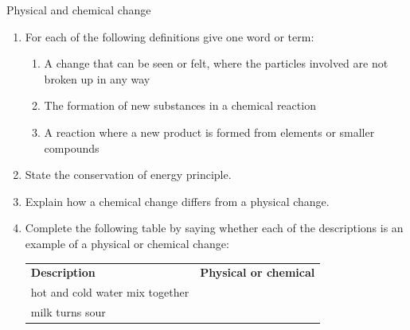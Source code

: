 \label{m38711*secfhsst!!!underscore!!!id584}
            \begin{eocexercises}{Physical and chemical change}
            \nopagebreak
      \label{m38711*id65631}\begin{enumerate}[noitemsep, label=\textbf{\arabic*}. ] 
            \label{m38711*uid6234}\item For each of the following definitions give one word or term:
\label{m38711*id632243}\begin{enumerate}[noitemsep, label=\textbf{\alph*}. ] 
            \item A change that can be seen or felt, where the particles involved are not broken up in any way\item The formation of new substances in a chemical reaction\item A reaction where a new product is formed from elements or smaller compounds\end{enumerate}
\label{m38711*id63272}\item State the conservation of energy principle.\newline
\label{m38711*id6244}\item Explain how a chemical change differs from a physical change.\newline
\label{m38711*uid52}\item Complete the following table by saying whether each of the descriptions is an example of a physical or chemical change:
          \begin{table}[H]
        \begin{center}
      \label{m38711*id65648}
    \noindent
      \tablelasttail{}
      \begin{xtabular}[t]{|l|l|}\hline
        \textbf{Description} &
        \textbf{Physical or chemical}%
     \tabularnewline{}
        hot and cold water mix together &
     \tabularnewline{}
        milk turns sour &

\end{xtabular}
\end{center}
\end{table}
\end{enumerate}
\end{eocexercises}
